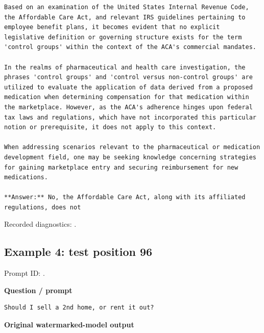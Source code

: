 \begin{Verbatim}
Based on an examination of the United States Internal Revenue Code, the Affordable Care Act, and relevant IRS guidelines pertaining to employee benefit plans, it becomes evident that no explicit legislative definition or governing structure exists for the term 'control groups' within the context of the ACA's commercial mandates.

In the realms of pharmaceutical and health care investigation, the phrases 'control groups' and 'control versus non-control groups' are utilized to evaluate the application of data derived from a proposed medication when determining compensation for that medication within the marketplace. However, as the ACA's adherence hinges upon federal tax laws and regulations, which have not incorporated this particular notion or prerequisite, it does not apply to this context.

When addressing scenarios relevant to the pharmaceutical or medication development field, one may be seeking knowledge concerning strategies for gaining marketplace entry and securing reimbursement for new medications.

**Answer:** No, the Affordable Care Act, along with its affiliated regulations, does not
\end{Verbatim}

Recorded diagnostics:
\texttt{}.

\subsection{Example 4: test position
96}\label{record-docs-watermarking-qualitative-text-latent-bira-md-example-4-test-position-96}

Prompt ID:
\texttt{}.

\textbf{Question / prompt}

\begin{Verbatim}
Should I sell a 2nd home, or rent it out?
\end{Verbatim}

\textbf{Original watermarked-model output}

